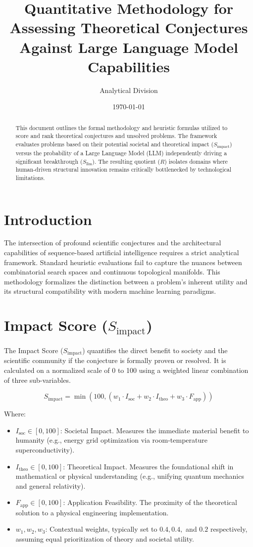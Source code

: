 \documentclass[11pt, letterpaper]{article}
\title{\textbf{Quantitative Methodology for Assessing Theoretical Conjectures Against Large Language Model Capabilities}}
\author{Analytical Division}
\date{\today}
\begin{document}
\maketitle

\begin{abstract}
This document outlines the formal methodology and heuristic formulas utilized to score and rank theoretical conjectures and unsolved problems. The framework evaluates problems based on their potential societal and theoretical impact ($S_{\text{impact}}$) versus the probability of a Large Language Model (LLM) independently driving a significant breakthrough ($S_{\text{llm}}$). The resulting quotient ($R$) isolates domains where human-driven structural innovation remains critically bottlenecked by technological limitations.
\end{abstract}

\section{Introduction}
The intersection of profound scientific conjectures and the architectural capabilities of sequence-based artificial intelligence requires a strict analytical framework. Standard heuristic evaluations fail to capture the nuances between combinatorial search spaces and continuous topological manifolds. This methodology formalizes the distinction between a problem's inherent utility and its structural compatibility with modern machine learning paradigms.

\section{Impact Score ($S_{\text{impact}}$)}
The Impact Score ($S_{\text{impact}}$) quantifies the direct benefit to society and the scientific community if the conjecture is formally proven or resolved. It is calculated on a normalized scale of 0 to 100 using a weighted linear combination of three sub-variables.

\begin{equation}
S_{\text{impact}} = \min \left( 100, \left( w_1 \cdot I_{\text{soc}} + w_2 \cdot I_{\text{theo}} + w_3 \cdot F_{\text{app}} \right) \right)
\end{equation}

Where:
\begin{itemize}
    \item $I_{\text{soc}} \in [0, 100]$: Societal Impact. Measures the immediate material benefit to humanity (e.g., energy grid optimization via room-temperature superconductivity).
    \item $I_{\text{theo}} \in [0, 100]$: Theoretical Impact. Measures the foundational shift in mathematical or physical understanding (e.g., unifying quantum mechanics and general relativity).
    \item $F_{\text{app}} \in [0, 100]$: Application Feasibility. The proximity of the theoretical solution to a physical engineering implementation.
    \item $w_1, w_2, w_3$: Contextual weights, typically set to $0.4, 0.4,$ and $0.2$ respectively, assuming equal prioritization of theory and societal utility.
\end{itemize}
\end{document}
